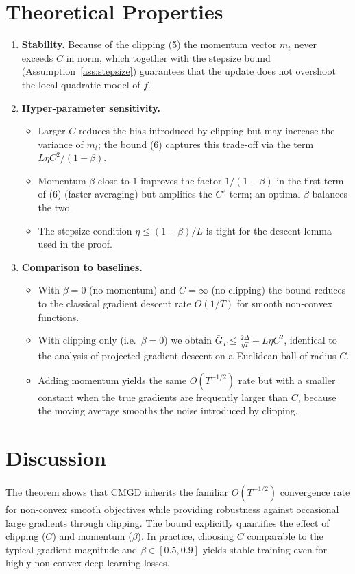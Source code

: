 \documentclass{article}
\begin{document}
\section*{Theoretical Properties}
\begin{enumerate}[label=\arabic*.]
\item \textbf{Stability.} Because of the clipping (5) the momentum vector $m_{t}$
never exceeds $C$ in norm, which together with the stepsize bound
(Assumption~\ref{ass:stepsize}) guarantees that the update does not
overshoot the local quadratic model of $f$.
\item \textbf{Hyper‑parameter sensitivity.}
    \begin{itemize}
        \item Larger $C$ reduces the bias introduced by clipping but may increase
              the variance of $m_{t}$; the bound (6) captures this trade‑off via the
              term $L\eta C^{2}/(1-\beta)$.
        \item Momentum $\beta$ close to $1$ improves the factor $1/(1-\beta)$ in
              the first term of (6) (faster averaging) but amplifies the
              $C^{2}$ term; an optimal $\beta$ balances the two.
        \item The stepsize condition $\eta\le (1-\beta)/L$ is tight for the
              descent lemma used in the proof.
    \end{itemize}
\item \textbf{Comparison to baselines.}
    \begin{itemize}
        \item With $\beta=0$ (no momentum) and $C=\infty$ (no clipping) the
              bound reduces to the classical gradient descent rate
              $O(1/T)$ for smooth non‑convex functions.
        \item With clipping only (i.e.\ $\beta=0$) we obtain
              $\bar G_{T}\le \frac{2\Delta}{\eta T}+L\eta C^{2}$,
              identical to the analysis of projected gradient descent on a
              Euclidean ball of radius $C$.
        \item Adding momentum yields the same $O(T^{-1/2})$ rate but with a
              smaller constant when the true gradients are frequently larger
              than $C$, because the moving average smooths the noise introduced
              by clipping.
    \end{itemize}
\end{enumerate}

\section*{Discussion}
The theorem shows that CMGD inherits the familiar
$O(T^{-1/2})$ convergence rate for non‑convex smooth objectives while
providing robustness against occasional large gradients through clipping.
The bound explicitly quantifies the effect of clipping ($C$) and momentum
($\beta$).  In practice, choosing $C$ comparable to the typical gradient
magnitude and $\beta\in[0.5,0.9]$ yields stable training even for highly
non‑convex deep learning losses.
\end{document}
